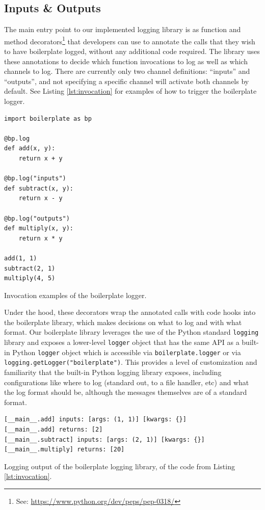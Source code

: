 \documentclass[acmsmall,review,authorversion]{acmart}
\newcommand{\code}[1]{\lstinline[basicstyle=\ttfamily\small]~#1~}
\begin{document}
\subsection{Inputs \& Outputs}

The main entry point to our implemented logging library is as function and method decorators\footnote{See: \href{https://www.python.org/dev/peps/pep-0318/}{https://www.python.org/dev/peps/pep-0318/}} that developers can use to annotate the calls that they wish to have boilerplate logged, without any additional code required. The library uses these annotations to decide which function invocations to log as well as which channels to log. There are currently only two channel definitions: ``inputs'' and ``outputs'', and not specifying a specific channel will activate both channels by default. See Listing \ref{lst:invocation} for examples of how to trigger the boilerplate logger.

\begin{listing}[H]
    \begin{verbatim}
import boilerplate as bp

@bp.log
def add(x, y):
    return x + y

@bp.log("inputs")
def subtract(x, y):
    return x - y

@bp.log("outputs")
def multiply(x, y):
    return x * y

add(1, 1)
subtract(2, 1)
multiply(4, 5)
    \end{verbatim}
    \caption{Invocation examples of the boilerplate logger.}
    \label{lst:invocation}
\end{listing}

Under the hood, these decorators wrap the annotated calls with code hooks into the boilerplate library, which makes decisions on what to log and with what format. Our boilerplate library leverages the use of the Python standard \code{logging} library and exposes a lower-level \code{logger} object that has the same API as a built-in Python \code{logger} object which is accessible via \code{boilerplate.logger} or via \code{logging.getLogger("boilerplate")}. This provides a level of customization and familiarity that the built-in Python logging library exposes, including configurations like where to log (standard out, to a file handler, etc) and what the log format should be, although the messages themselves are of a standard format.

\begin{listing}[H]
    \begin{verbatim}
[__main__.add] inputs: [args: (1, 1)] [kwargs: {}]
[__main__.add] returns: [2]
[__main__.subtract] inputs: [args: (2, 1)] [kwargs: {}]
[__main__.multiply] returns: [20]
    \end{verbatim}
    \caption{Logging output of the boilerplate logging library, of the code from Listing \ref{lst:invocation}.}
    \label{lst:log-examples}
\end{listing}
\end{document}
